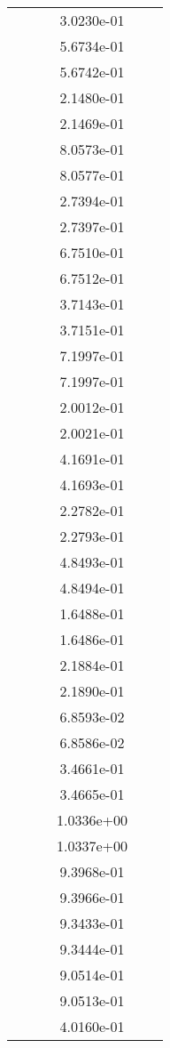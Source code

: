 \begin{xltabular}{\textwidth}{r|rS[table-format=1.3e+2]S[table-format=1.4e+2]S[table-format=1.4e+2]S[table-format=-1.5]}
&  &  & 3.0230e-01 & & \\
&  &  & 5.6734e-01 & & \\
&  &  & 5.6742e-01 & & \\
&  &  & 2.1480e-01 & & \\
&  &  & 2.1469e-01 & & \\
&  &  & 8.0573e-01 & & \\
&  &  & 8.0577e-01 & & \\
&  &  & 2.7394e-01 & & \\
&  &  & 2.7397e-01 & & \\
&  &  & 6.7510e-01 & & \\
&  &  & 6.7512e-01 & & \\
&  &  & 3.7143e-01 & & \\
&  &  & 3.7151e-01 & & \\
&  &  & 7.1997e-01 & & \\
&  &  & 7.1997e-01 & & \\
&  &  & 2.0012e-01 & & \\
&  &  & 2.0021e-01 & & \\
&  &  & 4.1691e-01 & & \\
&  &  & 4.1693e-01 & & \\
&  &  & 2.2782e-01 & & \\
&  &  & 2.2793e-01 & & \\
&  &  & 4.8493e-01 & & \\
&  &  & 4.8494e-01 & & \\
&  &  & 1.6488e-01 & & \\
&  &  & 1.6486e-01 & & \\
&  &  & 2.1884e-01 & & \\
&  &  & 2.1890e-01 & & \\
&  &  & 6.8593e-02 & & \\
&  &  & 6.8586e-02 & & \\
&  &  & 3.4661e-01 & & \\
&  &  & 3.4665e-01 & & \\
&  &  & 1.0336e+00 & & \\
&  &  & 1.0337e+00 & & \\
&  &  & 9.3968e-01 & & \\
&  &  & 9.3966e-01 & & \\
&  &  & 9.3433e-01 & & \\
&  &  & 9.3444e-01 & & \\
&  &  & 9.0514e-01 & & \\
&  &  & 9.0513e-01 & & \\
&  &  & 4.0160e-01 & & \\

\end{xltabular}
